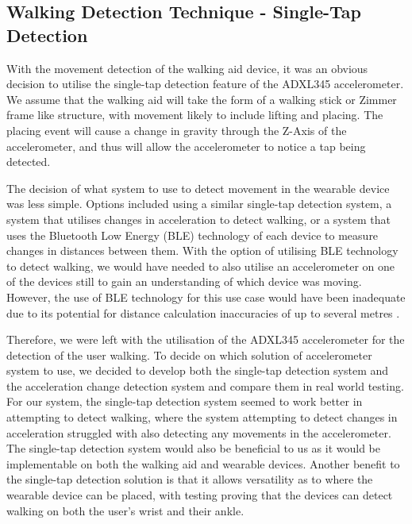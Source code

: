         \subsection{Walking Detection Technique - Single-Tap Detection}
        \label{subsec:walking_detection_technique}

           With the movement detection of the walking aid device, it was an obvious decision to utilise the single-tap detection feature of the ADXL345 accelerometer. We assume that the walking aid will take the form of a walking stick or Zimmer frame like structure, with movement likely to include lifting and placing. The placing event will cause a change in gravity through the Z-Axis of the accelerometer, and thus will allow the accelerometer to notice a tap being detected.

           The decision of what system to use to detect movement in the wearable device was less simple. Options included using a similar single-tap detection system, a system that utilises changes in acceleration to detect walking, or a system that uses the Bluetooth Low Energy (BLE) technology of each device to measure changes in distances between them. With the option of utilising BLE technology to detect walking, we would have needed to also utilise an accelerometer on one of the devices still to gain an understanding of which device was moving. However, the use of BLE technology for this use case would have been inadequate due to its potential for distance calculation inaccuracies of up to several metres \cite{Fachri_2019}. 

           Therefore, we were left with the utilisation of the ADXL345 accelerometer for the detection of the user walking. To decide on which solution of accelerometer system to use, we decided to develop both the single-tap detection system and the acceleration change detection system and compare them in real world testing. For our system, the single-tap detection system seemed to work better in attempting to detect walking, where the system attempting to detect changes in acceleration struggled with also detecting any movements in the accelerometer. The single-tap detection system would also be beneficial to us as it would be implementable on both the walking aid and wearable devices. Another benefit to the single-tap detection solution is that it allows versatility as to where the wearable device can be placed, with testing proving that the devices can detect walking on both the user's wrist and their ankle. 

